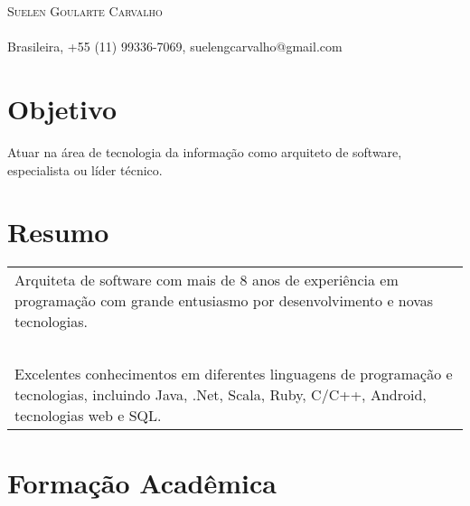 \documentclass[a4paper, oneside, final]{scrartcl}
\begin{document}
\begin{center}
\textsc{\Huge{Suelen Goularte Carvalho}}\\
\ \\
Brasileira, +55 (11) 99336-7069, suelengcarvalho@gmail.com


\section{Objetivo}
	Atuar na área de tecnologia da informação como arquiteto de software, especialista ou líder técnico.



\section{Resumo}

\begin{tabularx}{0.97\linewidth}{X}
	Arquiteta de software com mais de 8 anos de experiência em programação com grande entusiasmo por desenvolvimento e novas tecnologias. \\ \ \\
	
	Excelentes conhecimentos em diferentes linguagens de programação e tecnologias, incluindo Java, .Net, Scala, Ruby, C/C++, Android, tecnologias web e SQL.
\end{tabularx}

\section{Formação Acadêmica}


\end{center}
\end{document}
